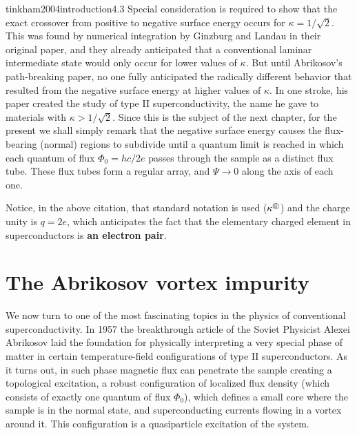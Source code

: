 \begin{cit}{tinkham2004introduction}{4.3}
    Special consideration is required to show that the exact crossover from positive to negative surface energy occurs for $\kappa = 1 /\sqrt{2}$. This was found by numerical integration by Ginzburg and Landau in their original paper, and they already anticipated that a conventional laminar intermediate state would only occur for lower values of $\kappa$. But until Abrikosov's path-breaking paper, no one fully anticipated the radically different behavior that resulted from the negative surface energy at higher values of $\kappa$. In one stroke, his paper created the study of type II superconductivity, the name he gave to materials with $\kappa > 1/\sqrt{2}$. Since this is the subject of the next chapter, for the present we shall simply remark that the negative surface energy causes the flux-bearing (normal) regions to subdivide until a quantum limit is reached in which each quantum of flux $\Phi_0 = hc/2e$ passes through the sample as a distinct flux tube. These flux tubes form a regular array, and $\Psi\to0$ along the axis of each one.
\end{cit}
Notice, in the above citation, that standard notation is used ($\kappa^\circledS$) and the charge unity is $q=2e$, which anticipates the fact that the elementary charged element in superconductors is \textbf{an electron pair}.

\section{The Abrikosov vortex impurity}

\def\vortexscale{0.85}
\def\smallradius{0.25}
\def\bigradius{0.65}
\def\xlength{0.9}
\def\ylength{0.7}
\def\ratio{2.5}
\def\smallradiusupdate{\smallradius/\ratio}
\def\bigradiusupdate{\bigradius/\ratio}
\def\pathradius{2.2*\bigradiusupdate}

We now turn to one of the most fascinating topics in the physics of conventional superconductivity. In 1957 the breakthrough article of the Soviet Physicist Alexei Abrikosov  \cite{Abrikosov:1956sx} laid the foundation for physically interpreting a very special phase of matter in certain temperature-field configurations of type II superconductors. As it turns out, in such phase magnetic flux can penetrate the sample creating a topological excitation, a robust configuration of localized flux density (which consists of exactly one quantum of flux $\Phi_0$), which defines a small core where the sample is in the normal state, and superconducting currents flowing in a vortex around it. This configuration is a quasiparticle excitation of the system.

